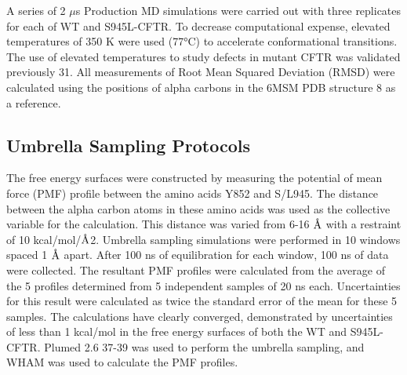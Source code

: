A series of 2 $\mu$s Production MD simulations were carried out with three replicates for each of WT and S945L-CFTR. To decrease computational expense, elevated temperatures of 350 K were used (77°C) to accelerate conformational transitions. The use of elevated temperatures to study defects in mutant CFTR was validated previously \cite{wong2022}31. All measurements of Root Mean Squared Deviation (RMSD) were calculated using the positions of alpha carbons in the 6MSM PDB structure 8 as a reference. 

\subsection{Umbrella Sampling Protocols}
The free energy surfaces were constructed by measuring the potential of mean force (PMF) profile between the amino acids Y852 and S/L945. The distance between the alpha carbon atoms in these amino acids was used as the collective variable for the calculation. This distance was varied from 6-16 $\mbox{\textup{\AA}}$ with a restraint of 10 kcal/mol/$\mbox{\textup{\AA}}$2. Umbrella sampling simulations were performed in 10 windows spaced 1 $\mbox{\textup{\AA}}$ apart. After 100 ns of equilibration for each window, 100 ns of data were collected. The resultant PMF profiles were calculated from the average of the 5 profiles determined from 5 independent samples of 20 ns each. Uncertainties for this result were calculated as twice the standard error of the mean for these 5 samples. The calculations have clearly converged, demonstrated by uncertainties of less than 1 kcal/mol in the free energy surfaces of both the WT and S945L-CFTR. Plumed 2.6 \cite{bonomi2009, tribello2019, bonomi2019}37-39 was used to perform the umbrella sampling, and WHAM \cite{grossfield2012} was used to calculate the PMF profiles. 
